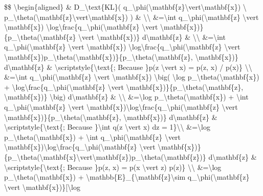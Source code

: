 \$\$ \textbackslash begin\{aligned\} \& D\_\textbackslash text\{KL\}( q\_\textbackslash phi(\textbackslash mathbf\{z\}\textbackslash vert\textbackslash mathbf\{x\}) \textbackslash\textbar{} p\_\textbackslash theta(\textbackslash mathbf\{z\}\textbackslash vert\textbackslash mathbf\{x\}) ) \& \textbackslash\textbackslash{} \&=\textbackslash int q\_\textbackslash phi(\textbackslash mathbf\{z\} \textbackslash vert \textbackslash mathbf\{x\}) \textbackslash log\textbackslash frac\{q\_\textbackslash phi(\textbackslash mathbf\{z\} \textbackslash vert \textbackslash mathbf\{x\})\}\{p\_\textbackslash theta(\textbackslash mathbf\{z\} \textbackslash vert \textbackslash mathbf\{x\})\} d\textbackslash mathbf\{z\} \& \textbackslash\textbackslash{} \&=\textbackslash int q\_\textbackslash phi(\textbackslash mathbf\{z\} \textbackslash vert \textbackslash mathbf\{x\}) \textbackslash log\textbackslash frac\{q\_\textbackslash phi(\textbackslash mathbf\{z\} \textbackslash vert \textbackslash mathbf\{x\})p\_\textbackslash theta(\textbackslash mathbf\{x\})\}\{p\_\textbackslash theta(\textbackslash mathbf\{z\}, \textbackslash mathbf\{x\})\} d\textbackslash mathbf\{z\} \& \textbackslash scriptstyle\{\textbackslash text\{; Because \}p(z \textbackslash vert x) = p(z, x) / p(x)\} \textbackslash\textbackslash{} \&=\textbackslash int q\_\textbackslash phi(\textbackslash mathbf\{z\} \textbackslash vert \textbackslash mathbf\{x\}) \textbackslash big( \textbackslash log p\_\textbackslash theta(\textbackslash mathbf\{x\}) + \textbackslash log\textbackslash frac\{q\_\textbackslash phi(\textbackslash mathbf\{z\} \textbackslash vert \textbackslash mathbf\{x\})\}\{p\_\textbackslash theta(\textbackslash mathbf\{z\}, \textbackslash mathbf\{x\})\} \textbackslash big) d\textbackslash mathbf\{z\} \& \textbackslash\textbackslash{} \&=\textbackslash log p\_\textbackslash theta(\textbackslash mathbf\{x\}) + \textbackslash int q\_\textbackslash phi(\textbackslash mathbf\{z\} \textbackslash vert \textbackslash mathbf\{x\})\textbackslash log\textbackslash frac\{q\_\textbackslash phi(\textbackslash mathbf\{z\} \textbackslash vert \textbackslash mathbf\{x\})\}\{p\_\textbackslash theta(\textbackslash mathbf\{z\}, \textbackslash mathbf\{x\})\} d\textbackslash mathbf\{z\} \& \textbackslash scriptstyle\{\textbackslash text\{; Because \}\textbackslash int q(z \textbackslash vert x) dz = 1\}\textbackslash\textbackslash{} \&=\textbackslash log p\_\textbackslash theta(\textbackslash mathbf\{x\}) + \textbackslash int q\_\textbackslash phi(\textbackslash mathbf\{z\} \textbackslash vert \textbackslash mathbf\{x\})\textbackslash log\textbackslash frac\{q\_\textbackslash phi(\textbackslash mathbf\{z\} \textbackslash vert \textbackslash mathbf\{x\})\}\{p\_\textbackslash theta(\textbackslash mathbf\{x\}\textbackslash vert\textbackslash mathbf\{z\})p\_\textbackslash theta(\textbackslash mathbf\{z\})\} d\textbackslash mathbf\{z\} \& \textbackslash scriptstyle\{\textbackslash text\{; Because \}p(z, x) = p(x \textbackslash vert z) p(z)\} \textbackslash\textbackslash{} \&=\textbackslash log p\_\textbackslash theta(\textbackslash mathbf\{x\}) + \textbackslash mathbb\{E\}\_\{\textbackslash mathbf\{z\}\textbackslash sim q\_\textbackslash phi(\textbackslash mathbf\{z\} \textbackslash vert \textbackslash mathbf\{x\})\}{[}\textbackslash log 